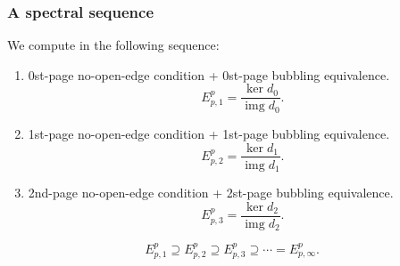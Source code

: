 \documentclass[xcolor=table, aspectratio=169,ignorenonframetext]{beamer}
\DeclareMathOperator{\img}{img}
\newcommand{\uone}{\text U(1)}
\begin{document}

\begin{frame}
\frametitle{A spectral sequence}
We compute in the following sequence:
\begin{enumerate}
\item 0st-page no-open-edge condition + 0st-page bubbling equivalence.
\[E^p_{p,1}=\frac{\ker d_0}{\img d_0}.\]
\item 1st-page no-open-edge condition + 1st-page bubbling equivalence.
\[E^p_{p,2}=\frac{\ker d_1}{\img d_1}.\]
\item 2nd-page no-open-edge condition + 2st-page bubbling equivalence.
\[E^p_{p,3}=\frac{\ker d_2}{\img d_2}.\]
\end{enumerate}

\[E^p_{p,1}\supseteq E^p_{p,2}\supseteq E^p_{p,3}\supseteq\cdots=E^p_{p,\infty}.\]
\end{frame}
\end{document}
